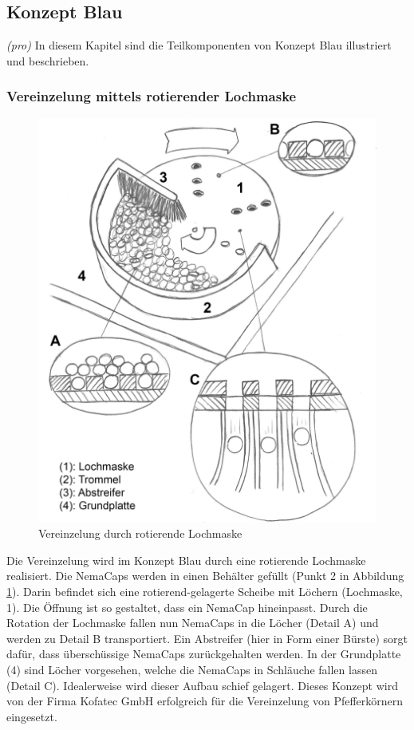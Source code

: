 \subsection{Konzept Blau}
\textit{(pro)} In diesem Kapitel sind die Teilkomponenten von Konzept Blau illustriert und beschrieben.


\subsubsection{Vereinzelung mittels rotierender Lochmaske}
\begin{figure}
	\includegraphics[scale=0.52]{Illustrationen/5-Konzept/schema_vereinzelung.jpg}
	\caption{Vereinzelung durch rotierende Lochmaske}
	\label{fig:schema_vereinzelung}
\end{figure}
Die Vereinzelung wird im Konzept  Blau durch eine rotierende Lochmaske realisiert. Die NemaCaps werden in einen Behälter gefüllt (Punkt 2 in Abbildung \ref{fig:schema_vereinzelung}). Darin befindet sich eine rotierend-gelagerte Scheibe mit Löchern (Lochmaske, 1). Die Öffnung ist so gestaltet, dass ein NemaCap hineinpasst. Durch die Rotation der Lochmaske fallen nun NemaCaps in die Löcher (Detail A) und werden zu Detail B transportiert. Ein Abstreifer (hier in Form einer Bürste) sorgt dafür, dass überschüssige NemaCaps zurückgehalten werden. In der Grundplatte (4) sind Löcher vorgesehen, welche die NemaCaps in Schläuche fallen lassen (Detail C). Idealerweise wird dieser Aufbau schief gelagert. 
\newline
Dieses Konzept wird von der Firma Kofatec GmbH erfolgreich für die Vereinzelung von Pfefferkörnern eingesetzt. 

